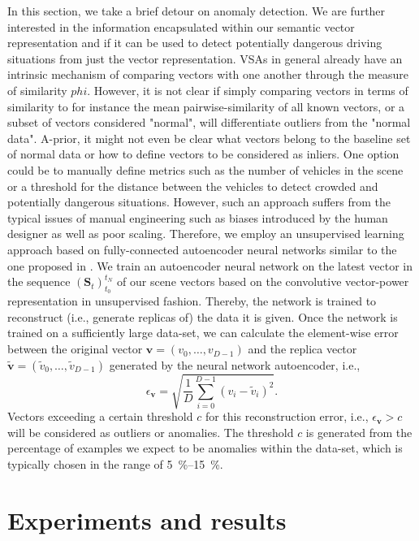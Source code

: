 In this section, we take a brief detour on anomaly detection.
We are further interested in the information encapsulated within our semantic vector representation and if it can be used to detect potentially dangerous driving situations from just the vector representation.
\acp{VSA} in general already have an intrinsic mechanism of comparing vectors with one another through the measure of similarity $phi$.
However, it is not clear if simply comparing vectors in terms of similarity to for instance the mean pairwise-similarity of all known vectors, or a subset of vectors considered "normal", will differentiate outliers from the "normal data".
A-prior, it might not even be clear what vectors belong to the baseline set of normal data or how to define vectors to be considered as inliers.
One option could be to manually define metrics such as the number of vehicles in the scene or a threshold for the distance between the vehicles to detect crowded and potentially dangerous situations.
However, such an approach suffers from the typical issues of manual engineering such as biases introduced by the human designer as well as poor scaling.
Therefore, we employ an unsupervised learning approach based on fully-connected autoencoder neural networks similar to the one proposed in \textcite{Chen2017}.
We train an autoencoder neural network on the latest vector in the sequence $(\mathbf{S}_{t})_{t_0}^{t_N}$ of our scene vectors based on the convolutive vector-power representation in unsupervised fashion.
Thereby, the network is trained to reconstruct (i.e., generate replicas of) the data it is given.
Once the network is trained on a sufficiently large data-set, we can calculate the element-wise error between the original vector $ \mathbf{v} = \left(v_{0}, \ldots, v_{D-1}\right)$ and the replica vector $ \tilde{\mathbf{v}} = \left(\tilde{v}_{0}, \ldots, \tilde{v}_{D-1}\right)$ generated by the neural network autoencoder, i.e.,
\begin{equation}
\label{eq:anom_error}
\epsilon_{ \mathbf{v}} = \sqrt{ \frac{1}{D} \sum\limits_{i=0}^{D-1} \left(v_{i} - \tilde{v}_{i}\right)^{2}}.
\end{equation}
Vectors exceeding a certain threshold $c$ for this reconstruction error, i.e., $\epsilon_{ \mathbf{v}} > c$ will be considered as outliers or anomalies.
The threshold $c$ is generated from the percentage of examples we expect to be anomalies within the data-set, which is typically chosen in the range of \SIrange{5}{15}{\percent}.

\section{Experiments and results}
\label{sec:experiments}

